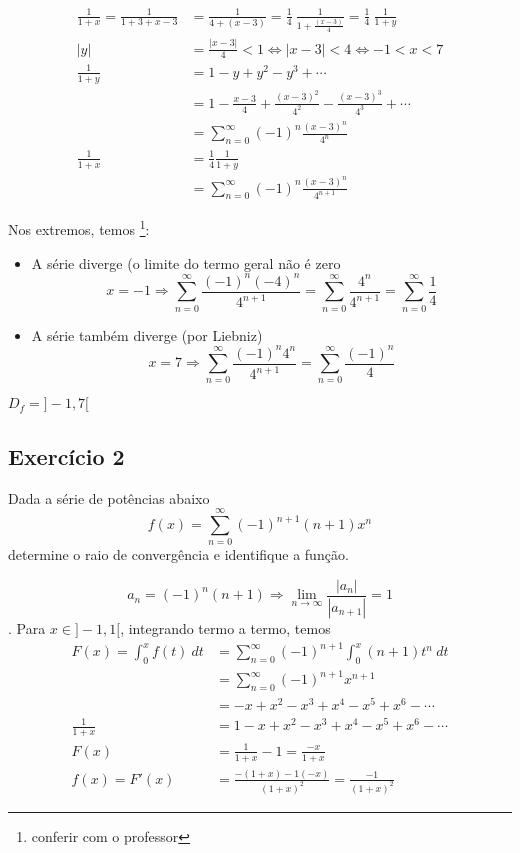\documentclass[12pt,openany, letterpaper]{book}
\newcommand{\LI}[1][n]{\lim_{{#1} \rightarrow \infty}}
\newcommand{\soma}[2][n]{\sum_{{#1} = #2}^\infty}
\newcommand{\E}[1]{Exercício #1}
\begin{document}
{{\begin{align*}
    \frac{1}{1+x} = \frac{1}{1+3+x-3} &= \frac{1}{4 + (x-3)} = \frac{1}{4} \ \frac{1}{1 + \frac{(x-3)}{4}} = \frac{1}{4} \ \frac{1}{1+y} \\
    |y| &= \frac{|x-3|}{4} < 1 \Longleftrightarrow |x-3| < 4 \Longleftrightarrow -1 < x < 7 \\
    \frac{1}{1+y} &= 1 - y + y^2 - y^3 + \cdots \\
    &= 1 - \frac{x-3}{4} + \frac{(x-3)^2}{4^2} - \frac{(x-3)^3}{4^3} + \cdots \\
    &= \soma{0} (-1)^n \frac{(x-3)^n}{4^n} \\
    \frac{1}{1+x} &= \frac{1}{4} \frac{1}{1+y} \\
    &= \soma{0} (-1)^n \frac{(x-3)^n}{4^{n+1}}
\end{align*}

Nos extremos, temos \footnote{conferir com o professor}:\begin{itemize}
\item A série diverge (o limite do termo geral não é zero $$x =-1 \Rightarrow \soma{0}\frac{(-1)^n(-4)^n}{4^{n+1}} = \soma{0} \frac{4^n}{4^{n+1}} = \soma{0} \frac{1}{4} $$
\item A série também diverge (por Liebniz) $$x = 7 \Rightarrow \soma{0}\frac{(-1)^n 4^n}{4^{n+1}} = \soma{0} \frac{(-1)^n}{4} $$
\end{itemize}

$D_f = ]-1,7[$

\subsection*{\E 2} Dada a série de potências abaixo $$f(x) = \soma{0} (-1)^{n+1} (n+1)x^n$$ determine o raio de convergência e identifique a função.

$$a_n = (-1)^n (n+1) \Rightarrow \LI \frac{|a_n|}{|a_{n+1}|} = 1$$. Para $x \in ]-1,1[$, integrando termo a termo, temos \begin{align*}
    F(x) = \int_0^x f(t) \ dt &= \soma{0} (-1)^{n+1} \int_0^x (n+1) t^{n} \ dt \\
    &= \soma{0} (-1)^{n+1} x^{n+1} \\
    &= -x + x^2 - x^3 + x^4 - x^5 + x^6 - \cdots \\
    \frac{1}{1+x} &= 1 - x + x^2 - x^3 + x^4 - x^5 + x^6 - \cdots \\
    F(x) &= \frac{1}{1+x} - 1 = \frac{-x}{1+x} \\
    f(x) = F'(x) &= \frac{-(1+x)-1(-x)}{(1+x)^2} = \frac{-1}{(1+x)^2}
\end{align*}

}}
\end{document}
